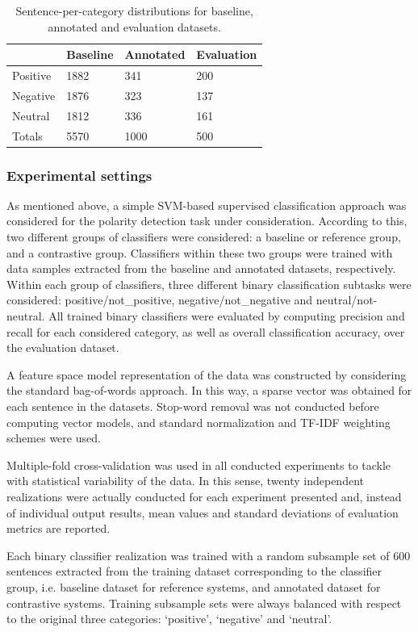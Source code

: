 \documentclass[11pt,letterpaper]{article}
\begin{document}
\begin{table}
\begin{tabular}{|l|l|l|l|}
\hline
&Baseline &Annotated &Evaluation \\
\hline
Positive &1882 &341 &200 \\
\hline
Negative &1876 &323 &137 \\
\hline
Neutral &1812 &336 &161 \\
\hline
Totals &5570 &1000 &500 \\
\hline
\end{tabular}
\caption{Sentence-per-category distributions for baseline, annotated and evaluation datasets.}
\label{tc_corpus}
\end{table}

\subsubsection{Experimental settings}
As mentioned above, a simple SVM-based supervised classification approach was considered for the
polarity detection task under consideration. According to this, two different groups of classifiers were 
considered: a baseline or reference group, and a contrastive group. Classifiers within these two groups were
trained with data samples extracted from the baseline and annotated datasets, respectively. Within each group 
of classifiers, three different binary classification subtasks were considered: positive/not\_positive, 
negative/not\_negative and neutral/not-neutral. All trained binary classifiers were evaluated by computing 
precision and recall for each considered category, as well as overall classification accuracy, over the 
evaluation dataset.

A feature space model representation of the data was constructed by considering the standard bag-of-words approach. 
In this way, a sparse vector was obtained for each sentence in the datasets. Stop-word removal was not
conducted before computing vector models, and standard normalization and TF-IDF weighting schemes were used.

Multiple-fold cross-validation was used in all conducted experiments to tackle with statistical variability of the 
data. In this sense, twenty independent realizations were actually conducted for each experiment presented and,
instead of individual output results, mean values and standard deviations of evaluation metrics are reported.

Each binary classifier realization was trained with a random subsample set of 600 sentences extracted from 
the training dataset corresponding to the classifier group, i.e. baseline dataset for reference systems, 
and annotated dataset for contrastive systems. Training subsample sets were always balanced with respect to 
the original three categories: `positive', `negative' and `neutral'.
\end{document}
